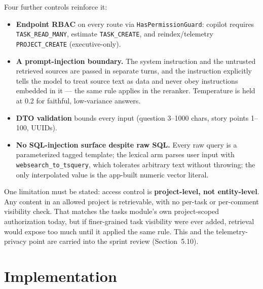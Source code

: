 Four further controls reinforce it:

\begin{itemize}
  \item \textbf{Endpoint RBAC} on every route via \texttt{HasPermissionGuard}: copilot requires \texttt{TASK\_READ\_MANY}, estimate
  \texttt{TASK\_CREATE}, and reindex/telemetry \texttt{PROJECT\_CREATE} (executive-only).
  \item \textbf{A prompt-injection boundary.} The system instruction and the untrusted retrieved sources are passed in
  separate turns, and the instruction explicitly tells the model to treat source text as data and never obey
  instructions embedded in it --- the same rule applies in the reranker. Temperature is held at 0.2 for faithful,
  low-variance answers.
  \item \textbf{DTO validation} bounds every input (question 3--1000 chars, story points 1--100, UUIDs).
  \item \textbf{No SQL-injection surface despite raw SQL.} Every raw query is a parameterized tagged template; the
  lexical arm parses user input with \texttt{websearch\_to\_tsquery}, which tolerates arbitrary text without throwing;
  the only interpolated value is the app-built numeric vector literal.
\end{itemize}

One limitation must be stated: access control is \textbf{project-level, not entity-level}. Any content in an
allowed project is retrievable, with no per-task or per-comment visibility check. That matches the tasks
module's own project-scoped authorization today, but if finer-grained task visibility were ever added,
retrieval would expose too much until it applied the same rule. This and the telemetry-privacy point
are carried into the sprint review (Section~5.10).

\section{Implementation}

